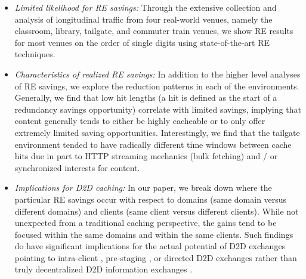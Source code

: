 \documentclass{sig-alternate}
\begin{document}
\begin{itemize}

\item \emph{Limited likelihood for RE savings:} Through the extensive collection and analysis of longitudinal traffic from four real-world venues, namely the classroom, library, tailgate, and commuter train venues, we show RE results for most venues on the order of single digits using state-of-the-art RE techniques.     

\item \emph{Characteristics of realized RE savings:} In addition to the higher level analyses of RE savings, we explore the reduction patterns in each of the environments.  Generally, we find that low hit lengths (a hit is defined as the start of a redundancy savings opportunity) correlate with limited savings, implying that content generally tends to either be highly cacheable or to only offer extremely limited saving opportunities. Interestingly, we find that the tailgate environment tended to have radically different time windows between cache hits due in part to HTTP streaming mechanics (bulk fetching) and / or synchronized interests for content.   

\item \emph{Implications for D2D caching:} In our paper, we break down where the particular RE savings occur with respect to domains (same domain versus different domains) and clients (same client versus different clients). While not unexpected from a traditional caching perspective, the gains tend to be focused within the same domains and within the same clients. Such findings do have significant implications for the actual potential of D2D exchanges pointing to intra-client \cite{EndRE:2010}, pre-staging \cite{Striegel:PASS}, or directed D2D exchanges rather than truly decentralized D2D information exchanges \cite{Ji:D2D}.  

\end{itemize}  
\end{document}
